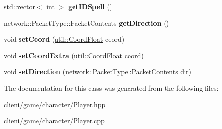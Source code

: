\begin{DoxyCompactItemize}
\item 
\hypertarget{classgame_1_1_player_a073412294066cd3e0da380f9d7af7a02}{std\-::vector$<$ int $>$ {\bfseries get\-I\-D\-Spell} ()}\label{classgame_1_1_player_a073412294066cd3e0da380f9d7af7a02}

\item 
\hypertarget{classgame_1_1_player_a3d494174f738cd3a9cf5d034be49baed}{network\-::\-Packet\-Type\-::\-Packet\-Contents {\bfseries get\-Direction} ()}\label{classgame_1_1_player_a3d494174f738cd3a9cf5d034be49baed}

\item 
\hypertarget{classgame_1_1_player_a6e0f65d14bfcb8fd2a31f13c88e21745}{void {\bfseries set\-Coord} (\hyperlink{classutil_1_1_coordinates}{util\-::\-Coord\-Float} coord)}\label{classgame_1_1_player_a6e0f65d14bfcb8fd2a31f13c88e21745}

\item 
\hypertarget{classgame_1_1_player_acff44a3aa4f49e4cf559371395a3377c}{void {\bfseries set\-Coord\-Extra} (\hyperlink{classutil_1_1_coordinates}{util\-::\-Coord\-Float} coord)}\label{classgame_1_1_player_acff44a3aa4f49e4cf559371395a3377c}

\item 
\hypertarget{classgame_1_1_player_ab3999cbe9668086900f7f0ecf3dedbf2}{void {\bfseries set\-Direction} (network\-::\-Packet\-Type\-::\-Packet\-Contents dir)}\label{classgame_1_1_player_ab3999cbe9668086900f7f0ecf3dedbf2}

\end{DoxyCompactItemize}


The documentation for this class was generated from the following files\-:\begin{DoxyCompactItemize}
\item 
client/game/character/Player.\-hpp\item 
client/game/character/Player.\-cpp\end{DoxyCompactItemize}
